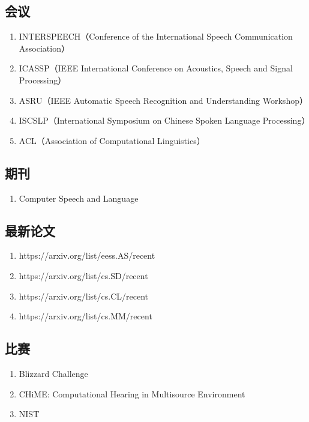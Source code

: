 \documentclass[cn,10pt,math=newtx,citestyle=gb7714-2015,bibstyle=gb7714-2015]{elegantbook}
\begin{document}
\subsection{会议}
\begin{enumerate}
  \item INTERSPEECH（Conference of the International Speech Communication Association）
  \item ICASSP（IEEE International Conference on Acoustics, Speech and Signal Processing）
  \item ASRU（IEEE Automatic Speech Recognition and Understanding Workshop）
  \item ISCSLP（International Symposium on Chinese Spoken Language Processing）
  \item ACL（Association of Computational Linguistics）
\end{enumerate}

\subsection{期刊}
\begin{enumerate}
  \item Computer Speech and Language
\end{enumerate}

\subsection{最新论文}
\begin{enumerate}
  \item https://arxiv.org/list/eess.AS/recent
  \item https://arxiv.org/list/cs.SD/recent
  \item https://arxiv.org/list/cs.CL/recent
  \item https://arxiv.org/list/cs.MM/recent
\end{enumerate}

\subsection{比赛}
\begin{enumerate}
  \item Blizzard Challenge
  \item CHiME: Computational Hearing in Multisource Environment
  \item NIST
\end{enumerate}
\end{document}
